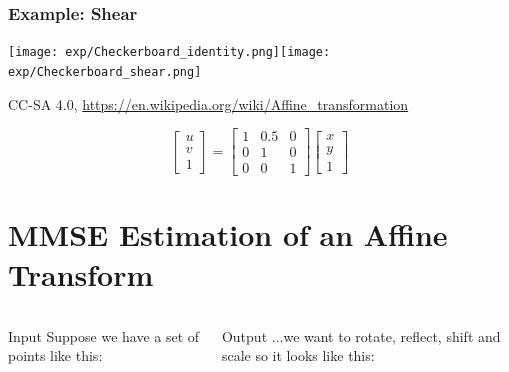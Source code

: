 \documentclass{beamer}
\begin{document}
\begin{frame}
  \frametitle{Example: Shear}
  \centerline{\texttt{[image: exp/Checkerboard\_identity.png]}\texttt{[image: exp/Checkerboard\_shear.png]}}
  \centerline{\small CC-SA 4.0, \url{https://en.wikipedia.org/wiki/Affine_transformation}}
  \[
  \left[\begin{array}{c} u\\v\\1\end{array}\right]=
  \left[\begin{array}{ccc}1&0.5&0\\0&1&0\\0&0&1\end{array}\right]
  \left[\begin{array}{c}x\\y\\1\end{array}\right]
  \]
\end{frame}

\section{MMSE Estimation of an Affine Transform}
\setcounter{subsection}{1}

\begin{frame}
  \begin{columns}[t]
    \column{2.5in}
    \begin{block}{Input}
      Suppose we have a set of points like this:
      \centerline{}
    \end{block}
    \column{2.25in}
    \begin{block}{Output}
      ...we want to rotate, reflect, shift and scale so it looks like
      this:
      \centerline{}
    \end{block}
  \end{columns}
\end{frame}
\end{document}
